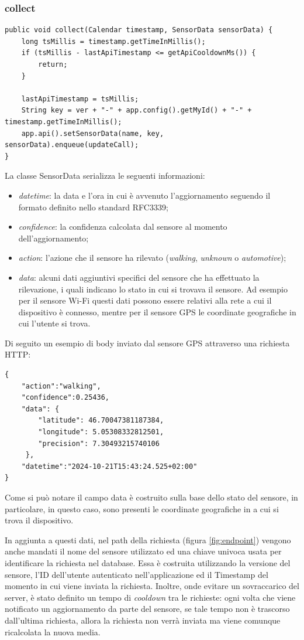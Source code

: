 \subsubsection{collect}
\begin{verbatim}
public void collect(Calendar timestamp, SensorData sensorData) {
    long tsMillis = timestamp.getTimeInMillis();
    if (tsMillis - lastApiTimestamp <= getApiCooldownMs()) {
        return;
    }

    lastApiTimestamp = tsMillis;
    String key = ver + "-" + app.config().getMyId() + "-" + timestamp.getTimeInMillis();
    app.api().setSensorData(name, key, sensorData).enqueue(updateCall);
}
\end{verbatim}
La classe SensorData serializza le seguenti informazioni:
\begin{itemize}
    \item \textit{datetime}: la data e l'ora in cui è avvenuto l'aggiornamento seguendo il formato definito nello standard RFC3339\cite{ref:RFC3339};
    \item \textit{confidence}: la confidenza calcolata dal sensore al momento dell'aggiornamento;
    \item \textit{action}: l'azione che il sensore ha rilevato (\textit{walking}, \textit{unknown} o \textit{automotive});
    \item \textit{data}: alcuni dati aggiuntivi specifici del sensore che ha effettuato la rilevazione, i quali indicano lo stato in cui si trovava il sensore. Ad esempio per il sensore Wi-Fi questi dati possono essere relativi alla rete a cui il dispositivo è connesso, mentre per il sensore GPS le coordinate geografiche in cui l'utente si trova.
\end{itemize}
Di seguito un esempio di body inviato dal sensore GPS attraverso una richiesta HTTP:
\begin{verbatim}
{
    "action":"walking",
    "confidence":0.25436,
    "data": {
        "latitude": 46.70047381187384,
        "longitude": 5.05308332812501,
        "precision": 7.30493215740106
     },
    "datetime":"2024-10-21T15:43:24.525+02:00"
}
\end{verbatim}
Come si può notare il campo data è costruito sulla base dello stato del sensore, in particolare, in questo caso, sono presenti le coordinate geografiche in a cui si trova il dispositivo.

In aggiunta a questi dati, nel path della richiesta (figura \ref{fig:endpoint}) vengono anche mandati il nome del sensore utilizzato ed una chiave univoca usata per identificare la richiesta nel database. Essa è costruita utilizzando la versione del sensore, l'ID dell'utente autenticato nell'applicazione ed il Timestamp del momento in cui viene inviata la richiesta. Inoltre, onde evitare un sovraccarico del server, è stato definito un tempo di \textit{cooldown} tra le richieste: ogni volta che viene notificato un aggiornamento da parte del sensore, se tale tempo non è trascorso dall'ultima richiesta, allora la richiesta non verrà inviata ma viene comunque ricalcolata la nuova media.
